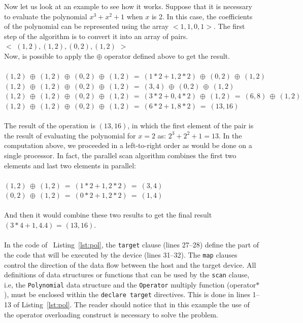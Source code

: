 \documentclass[Ingles]{ic-tese-v1}
\newcommand{\ttt}[1]{{\texttt{#1}}}
\newcommand{\rlst}[1]{Listing~\ref{lst:#1}}
\begin{document}
Now let us look at an example to see how it works. Suppose that it is necessary to evaluate the
polynomial $x^{3} + x^{2} + 1$ when $x$ is 2. In this case, the coefficients of the
polynomial can be represented using the array $<1, 1, 0, 1>$. The first step of the
algorithm is to convert it into an array of pairs.\\

$<$ $(1, 2), (1, 2), (0, 2), (1, 2)$ $>$\\

Now, is possible to apply the $\oplus$ operator defined above to get the result.\\\\
$(1, 2)\:\oplus\:(1, 2)\:\oplus\:(0, 2)\:\oplus\:(1, 2)\:=\:(1 * 2 + 1, 2 * 2)\:\oplus\:(0, 2)\: \oplus\:(1, 2)$\\
$(1, 2)\:\oplus\:(1, 2)\:\oplus\:(0, 2)\:\oplus\:(1, 2)\:=\:(3, 4)\:\oplus\:(0, 2)\:\oplus\:(1, 2)$\\
$(1, 2)\:\oplus\:(1, 2)\:\oplus\:(0, 2)\:\oplus\:(1, 2)\:=\:(3*2 + 0, 4 * 2)\:\oplus\:(1, 2)\:=\:(6, 8)\:\oplus\:(1, 2)$\\
$(1, 2)\:\oplus\:(1, 2)\:\oplus\:(0, 2)\:\oplus\:(1, 2)\:=\:(6*2 + 1, 8 * 2) \:=\:(13, 16)$\\\\

The result of the operation is $(13, 16)$, in which the first element of the pair  is the result  of
evaluating the polynomial for $x = 2$  as: $2^{3} + 2^{2} + 1 = 13$.
In the computation above, we proceeded in a left-to-right order as would be
done on a single processor. In fact, the parallel scan algorithm
combines the first two elements and last two elements in parallel:\\\\
$(1, 2) \:\oplus\: (1, 2) \:=\: (1 * 2 + 1, 2 * 2) \:=\: (3, 4)$\\
$(0, 2) \:\oplus\: (1, 2) \:=\: (0 * 2 + 1, 2 * 2) \:=\: (1, 4)$\\\\
And then it would combine these two results to get the final result $(3 * 4 + 1, 4 . 4)$
= $(13, 16)$.
\\\\
In the code of ~\rlst{pol}, the \ttt{target} clause (lines 27--28) define the part of the code
that will  be  executed by  the device  (lines 31--32).  The \ttt{map} clauses control the direction  of the data flow
between the host and the target device. All definitions of data structures
or functions  that can be used  by the \ttt{scan} clause,  i.e, the
\ttt{Polynomial} data  structure and the \ttt{Operator}  multiply function
(operator$*$),  must   be  enclosed  within  the   \ttt{declare  target}
directives. This is done in lines 1--13 of \rlst{pol}.
The reader should notice that in this example the use of the operator overloading
construct is necessary to solve the problem.
\end{document}
